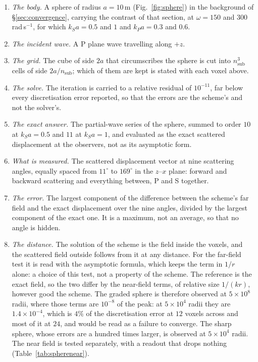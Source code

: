 \documentclass[11pt,a4paper]{article}
\begin{document}
\begin{enumerate}
\item \emph{The body.} A sphere of radius $a=10$\,m (Fig.~\ref{fig:sphere}) in the background of \S\ref{sec:convergence},
carrying the contrast of that section, at $\omega=150$ and $300$\,rad\,s$^{-1}$, for which $k_Sa=0.5$ and
$1$ and $k_Pa=0.3$ and $0.6$.
\item \emph{The incident wave.} A P plane wave travelling along $+z$.
\item \emph{The grid.} The cube of side $2a$ that circumscribes the sphere is cut into
$n_{\mathrm{sub}}^3$ cells of side $2a/n_{\mathrm{sub}}$; which of them are kept is stated with each
voxel above.
\item \emph{The solve.} The iteration is carried to a relative residual of $10^{-11}$, far below every
discretisation error reported, so that the errors are the scheme's and not the solver's.
\item \emph{The exact answer.} The partial-wave series of the sphere, summed to order $10$ at
$k_Sa=0.5$ and $11$ at $k_Sa=1$, and evaluated as the exact scattered displacement at the observers,
not as its asymptotic form.
\item \emph{What is measured.} The scattered displacement vector at nine scattering angles, equally
spaced from $11^\circ$ to $169^\circ$ in the $z$--$x$ plane: forward and backward scattering and
everything between, P and S together.
\item \emph{The error.} The largest component of the difference between the scheme's far field and the
exact displacement over the nine angles, divided by the largest component of the exact one. It is a
maximum, not an average, so that no angle is hidden.
\item \emph{The distance.} The solution of the scheme is the field inside the voxels, and the
scattered field outside follows from it at any distance. For the far-field test it is read with the
asymptotic formula, which keeps the term in $1/r$ alone: a choice of this test, not a property of the
scheme. The reference is the exact field, so the two differ by the near-field terms, of relative size
$1/(kr)$, however good the scheme.
The graded sphere is therefore observed at $5\times10^8$ radii, where those terms are $10^{-8}$ of the
peak: at $5\times10^4$ radii they are $1.4\times10^{-4}$, which is $4\%$ of the discretisation error
at $12$ voxels across and most of it at $24$, and would be read as a failure to converge. The sharp
sphere, whose errors are a hundred times larger, is observed at $5\times10^4$ radii. The near field is
tested separately, with a readout that drops nothing (Table~\ref{tab:spherenear}).
\end{enumerate}
\end{document}
